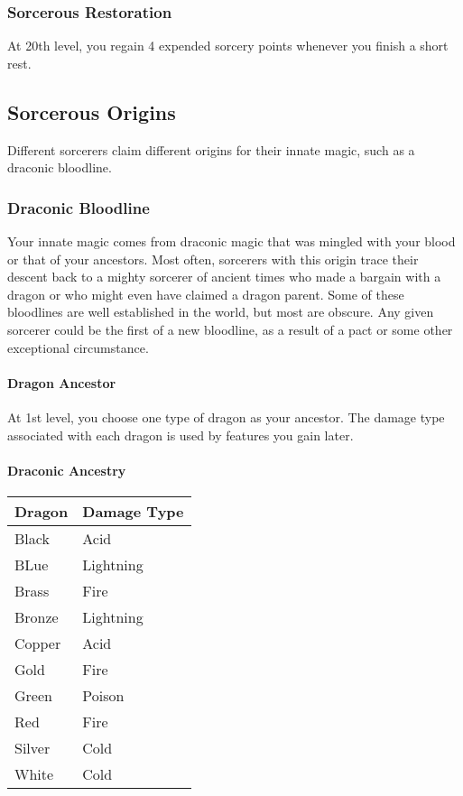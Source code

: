 \documentclass[
]{article}
\begin{document}
\hypertarget{sorcerous-restoration}{%
\subsubsection{Sorcerous Restoration}\label{sorcerous-restoration}}

At 20th level, you regain 4 expended sorcery points whenever you finish
a short rest.

\hypertarget{sorcerous-origins}{%
\subsection{Sorcerous Origins}\label{sorcerous-origins}}

Different sorcerers claim different origins for their innate magic, such
as a draconic bloodline.

\hypertarget{draconic-bloodline}{%
\subsubsection{Draconic Bloodline}\label{draconic-bloodline}}

Your innate magic comes from draconic magic that was mingled with your
blood or that of your ancestors. Most often, sorcerers with this origin
trace their descent back to a mighty sorcerer of ancient times who made
a bargain with a dragon or who might even have claimed a dragon parent.
Some of these bloodlines are well established in the world, but most are
obscure. Any given sorcerer could be the first of a new bloodline, as a
result of a pact or some other exceptional circumstance.

\hypertarget{dragon-ancestor}{%
\paragraph{Dragon Ancestor}\label{dragon-ancestor}}

At 1st level, you choose one type of dragon as your ancestor. The damage
type associated with each dragon is used by features you gain later.

\hypertarget{draconic-ancestry}{%
\paragraph{Draconic Ancestry}\label{draconic-ancestry}}

\begin{longtable}[]{@{}ll@{}}
\toprule
Dragon & Damage Type\tabularnewline
\midrule
\endhead
Black & Acid\tabularnewline
BLue & Lightning\tabularnewline
Brass & Fire\tabularnewline
Bronze & Lightning\tabularnewline
Copper & Acid\tabularnewline
Gold & Fire\tabularnewline
Green & Poison\tabularnewline
Red & Fire\tabularnewline
Silver & Cold\tabularnewline
White & Cold\tabularnewline
\bottomrule
\end{longtable}
\end{document}

